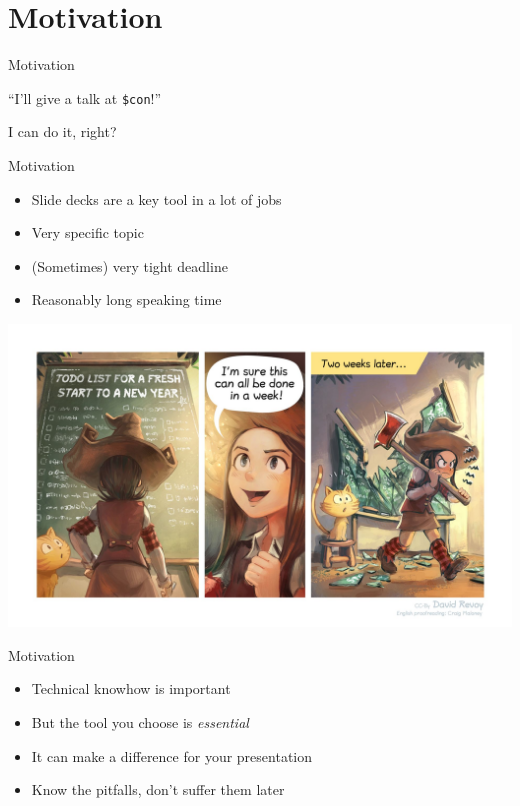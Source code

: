 \documentclass[aspectratio=169]{divoc}
\begin{document}
\section{Motivation}
\begin{frame}{Motivation}
  \begin{center}
    \enquote{I'll give a talk at \texttt{\$con}!}

    I can do it, right?
  \end{center}
\end{frame}
\begin{frame}{Motivation}
  \begin{itemize}
    \item Slide decks are a key tool in a lot of jobs
    \item Very specific topic
    \item (Sometimes) very tight deadline
    \item Reasonably long speaking time
  \end{itemize}
\end{frame}
\begin{frame}
  \begin{center}
    \includegraphics[width=\textwidth,keepaspectratio]{figures/2022-01-14_Strip-Comic_The-TODO-List_by-David-Revoy.jpg}
  \end{center}
\end{frame}
\begin{frame}{Motivation}
  \begin{itemize}
    \item Technical knowhow is important
    \item But the tool you choose is \emph{essential}
    \item It can make a difference for your presentation
    \item Know the pitfalls, don't suffer them later
  \end{itemize}
\end{frame}
\end{document}
